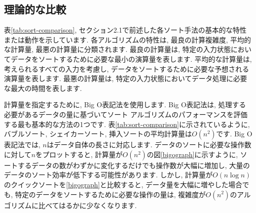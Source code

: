 \documentclass[a4j, 12pt]{jarticle}
\begin{document}
\subsection{理論的な比較}
表\ref{tab:sort-comparison}, セクション2.1で前述した各ソート手法の基本的な特性または動作を示しています. 各アルゴリズムの特性は, 最良の計算複雑度, 平均的な計算量, 最悪の計算量に分類されます. 最良の計算量は, 特定の入力状態においてデータをソートするために必要な最小の演算量を表します. 平均的な計算量は, 考えられるすべての入力を考慮し, データをソートするために必要な予想される演算量を表します. 最悪の計算量は, 特定の入力状態においてデータ処理に必要な最大の時間を表します.
\begin{table}[htbp]
  \centering
  \caption{各ソートアルゴリズムの計算量と特徴の比較}\label{tab:sort-comparison}
\end{table}

計算量を指定するために, Big O表記法を使用します. Big O表記法は, 処理する必要があるデータの量に基づいてソート アルゴリズムのパフォーマンスを評価する最も基本的な方法の1つです. 表\ref{tab:sort-comparison}に示されているように, バブルソート, シェイカーソート, 挿入ソートの平均計算量は$O(n^2)$です. Big O表記法では, $n$はデータ自体の長さに対応します. データのソートに必要な操作数に対して$n$をプロットすると, 計算量が$O(n^2)$の図\ref{bigograph}に示すように, ソートするデータの数がわずかに変化するだけでも操作数が大幅に増加し, 大量のデータのソート効率が低下する可能性があります. しかし, 計算量が$O(n \log n)$のクイックソートを\ref{bigograph}と比較すると, データ量を大幅に増やした場合でも, 特定のデータをソートするために必要な操作の量は, 複雑度が$O(n^2)$のアルゴリズムに比べてはるかに少なくなります.\\
\end{document}
